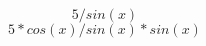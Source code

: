 \documentclass{article}
\begin{document}
$$5/sin{(x)}$$
$$5*cos{(x)}/sin{(x)}*sin{(x)}$$
\end{document}
